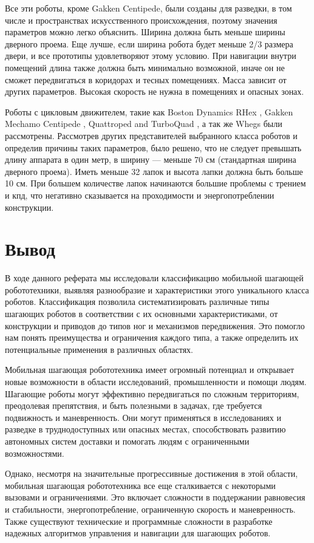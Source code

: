 Все эти роботы, кроме Gakken Centipede, были созданы для разведки, в том числе и пространствах искусственного происхождения, поэтому значения параметров можно легко объяснить. Ширина должна быть меньше ширины дверного проема. Еще лучше, если ширина робота будет меньше 2/3 размера двери, и все прототипы удовлетворяют этому условию. При навигации внутри помещений длина также должна быть минимально возможной, иначе он не сможет передвигаться в коридорах и тесных помещениях. Масса зависит от других параметров. Высокая скорость не нужна в помещениях и опасных зонах. 

Роботы с цикловым движителем, такие как Boston Dynamics RHex \cite{Altendorfer2001}, Gakken Mechamo Centipede \cite{Miller2019}, Quattroped and TurboQuad \cite{Chen2011,Chen2014,Chen2017}, а так же Whegs \cite{schroerComparingCockroachWhegs2004} были рассмотрены. Рассмотрев других представителей выбранного класса роботов и определив причины таких параметров, было решено, что не следует превышать длину аппарата в один метр, в ширину --- меньше 70 см (стандартная ширина дверного проема). Иметь меньше 32 лапок и высота лапки должна быть больше 10 см. При большем количестве лапок начинаются большие проблемы с трением и кпд, что негативно сказывается на проходимости и энергопотреблении конструкции.


\section*{Вывод}
В ходе данного реферата мы исследовали классификацию мобильной шагающей робототехники, выявляя разнообразие и характеристики этого уникального класса роботов. Классификация позволила систематизировать различные типы шагающих роботов в соответствии с их основными характеристиками, от конструкции и приводов до типов ног и механизмов передвижения. Это помогло нам понять преимущества и ограничения каждого типа, а также определить их потенциальные применения в различных областях.

Мобильная шагающая робототехника имеет огромный потенциал и открывает новые возможности в области исследований, промышленности и помощи людям. Шагающие роботы могут эффективно передвигаться по сложным территориям, преодолевая препятствия, и быть полезными в задачах, где требуется подвижность и маневренность. Они могут применяться в исследованиях и разведке в труднодоступных или опасных местах, способствовать развитию автономных систем доставки и помогать людям с ограниченными возможностями.

Однако, несмотря на значительные прогрессивные достижения в этой области, мобильная шагающая робототехника все еще сталкивается с некоторыми вызовами и ограничениями. Это включает сложности в поддержании равновесия и стабильности, энергопотребление, ограниченную скорость и маневренность. Также существуют технические и программные сложности в разработке надежных алгоритмов управления и навигации для шагающих роботов.

